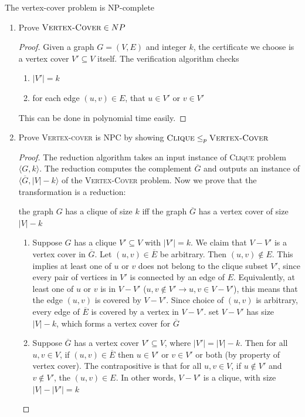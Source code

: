 \documentclass[11pt]{article}
\begin{document}
\begin{theorem*}
    The vertex-cover problem is NP-complete
    \begin{enumerate}
        \item Prove $\textsc{Vertex-Cover}\in NP$ 
        \begin{proof}
            Given a graph $G = (V,E)$ and integer $k$, the certificate we choose is a vertex cover $V' \subseteq V$ itself. The verification algorithm checks 
            \begin{enumerate}
                \item $|V'| = k$ 
                \item for each edge $(u,v)\in E$, that $u\in V'$ or $v\in V'$ 
            \end{enumerate}
            This can be done in polynomial time easily.
        \end{proof}
        \item Prove \textsc{Vertex-cover} is NPC by showing $\textsc{Clique} \leq_p \textsc{Vertex-Cover}$
        \begin{proof}
            The reduction algorithm takes an input instance of \textsc{Clique} problem $\langle G, k\rangle$. The reduction computes the complement $\overline{G}$ and outputs an instance of $\langle \overline{G}, |V| - k\rangle$ of the \textsc{Vertex-Cover} problem. Now we prove that the transformation is a reduction: 
            \begin{center}
                the graph $G$ has a clique of size $k$ iff the graph $\overline{G}$ has a vertex cover of size $|V| - k$
            \end{center}
            \begin{enumerate}
                \item Suppose $G$ has a clique $V' \subseteq V$ with $|V'| = k$. We claim that $V - V'$ is a vertex cover in $\overline{G}$. Let $(u,v)\in \overline{E}$ be arbitrary. Then $(u,v) \not\in E$. This implies at least one of $u$ or $v$ does not belong to the clique subset $V'$, since every pair of vertices in $V'$ is connected by an edge of $E$. Equivalently, at least one of $u$ or $v$ is in $V - V'$ ($u,v\notin V' \to u,v\in V -V'$), this means that the edge $(u,v)$ is covered by $V-V'$. Since choice of $(u,v)$ is arbitrary, every edge of $\overline{E}$ is covered by a vertex in $V-V'$. set $V-V'$ has size $|V| - k$, which forms a vertex cover for $\overline{G}$
                \item Suppose $\overline{G}$ has a vertex cover $V'\subseteq V$, where $|V'| = |V| - k$. Then for all $u,v\in V$, if $(u,v) \in \overline{E}$ then $u\in V'$ or $v\in V'$ or both (by property of vertex cover). The contrapositive is that for all $u,v\in V$, if $u\not\in V'$ and $v\not\in V'$, the $(u,v)\in E$. In other words, $V-V'$ is a clique, with size $|V|- |V'| = k$
            \end{enumerate}
        \end{proof}
    \end{enumerate}
\end{theorem*}
\end{document}
